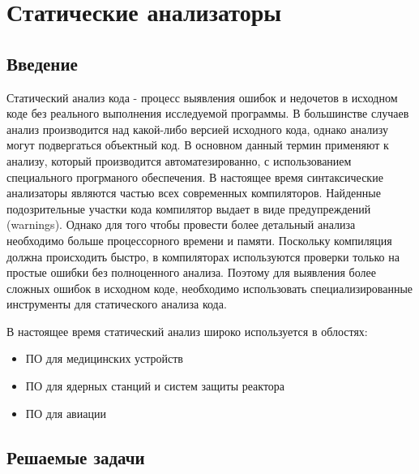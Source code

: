 \chapter{Статические анализаторы}

\section{Введение}

Статический анализ кода - процесс выявления ошибок и недочетов в исходном коде без реального выполнения 
исследуемой программы. В большинстве случаев анализ производится над какой-либо версией исходного кода,
однако анализу могут подвергаться объектный код. В основном данный термин применяют к анализу,
который производится автоматезированно, с использованием специального прогрманого обеспечения.
В настоящее время синтаксические анализаторы являются частью всех современных компиляторов. 
Найденные подозрительные участки кода компилятор выдает в виде предупреждений (warnings). 
Однако для того чтобы провести более детальный анализа необходимо больше процессорного времени и памяти. 
Поскольку компиляция должна происходить быстро, в компиляторах используются проверки только
на простые ошибки без полноценного анализа. Поэтому для выявления более сложных ошибок в исходном коде, 
необходимо использовать специализированные инструменты для статического анализа кода.

В настоящее время статический анализ широко используется в облостях:
\begin{itemize}
	\item ПО для медицинских устройств
	\item ПО для ядерных станций и систем защиты реактора
	\item ПО для авиации
\end{itemize}

\section{Решаемые задачи}

